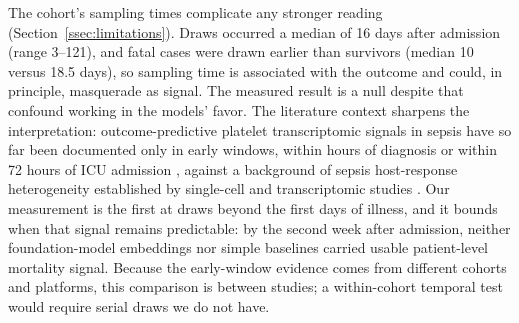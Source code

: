 The cohort's sampling times complicate any stronger reading
(Section~\ref{ssec:limitations}). Draws occurred a median of 16 days after
admission (range 3--121), and fatal cases were drawn earlier than survivors
(median 10 versus 18.5 days), so sampling time is associated with the outcome
and could, in principle, masquerade as signal. The measured result is a null
despite that confound working in the models' favor. The literature context
sharpens the interpretation: outcome-predictive platelet transcriptomic signals
in sepsis have so far been documented only in early windows, within hours of
diagnosis or within 72 hours of ICU admission
\citep{qiu2021sepsis, middleton2019sepsis, middleton2020nets}, against a
background of sepsis host-response heterogeneity established by single-cell
and transcriptomic studies \citep{reyes2020immune, davenport2016genomic,
sweeney2018unsupervised}. Our measurement is the first at
draws beyond the first days of illness, and it bounds when that signal remains
predictable: by the second week after admission, neither foundation-model
embeddings nor simple baselines carried usable patient-level mortality signal.
Because the early-window evidence comes from different cohorts and platforms,
this comparison is between studies; a within-cohort temporal test would
require serial draws we do not have.
